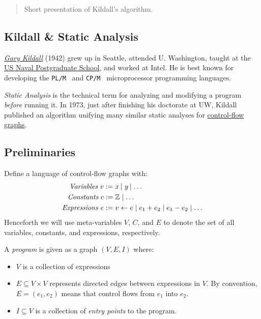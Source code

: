 \documentclass{article}
\begin{document}
\begin{abstract}
  Short presentation of Kildall's algorithm.
\end{abstract}

\subsection*{Kildall \& Static Analysis}
\href{https://en.wikipedia.org/wiki/Gary_Kildall}{\emph{Gary Kildall}} (1942) grew up in Seattle, attended U. Washington, taught at the \href{http://www.nps.edu/}{US Naval Postgraduate School}, and worked at Intel.
He is best known for developing the {\tt PL/M}~\cite{plm} and {\tt CP/M}~\cite{cpm} microprocessor programming languages.

\emph{Static Analysis} is the technical term for analyzing and modifying a program \emph{before} running it.
In 1973, just after finishing his doctorate at UW, Kildall published an algorithm unifying many similar static analyses for \href{http://www.cs.cornell.edu/courses/cs412/2008sp/lectures/lec24.pdf}{control-flow graphs}.


\subsection*{Preliminaries}
Define a language of control-flow graphs with:
\begin{align*}
  \emph{Variables}  ~v &:= \emph{x}
                           \mid \emph{y}
                           \mid \ldots
\\\emph{Constants}  ~c &:= \mathbb{Z}
                           \mid \ldots
\\\emph{Expressions}~e &:= v \leftarrow e
                             \mid e_1 + e_2
                             \mid e_1 - e_2
                             \mid \ldots
\end{align*}
Henceforth we will use meta-variables $V$, $C$, and $E$ to denote the set of all variables, constants, and expressions, respectively.

A \emph{program} is given as a graph $(V, E, I)$ where:
\begin{itemize}
\item
  $V$ is a collection of expressions
\item
  $E \subseteq V \times V$ represents directed edges between expressions in $V$.
  By convention, $E = (e_1, e_2)$ means that control flows from $e_1$ into $e_2$.
\item
  $I \subseteq V$ is a collection of \emph{entry points} to the program.
\end{itemize}
\end{document}
